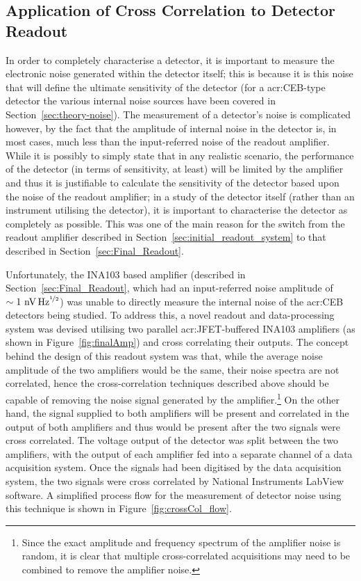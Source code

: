 \subsection{Application of Cross Correlation to Detector Readout}
\label{ssec:appCrossCol}
In order to completely characterise a detector, it is important to measure the electronic noise generated within the detector itself; this is because it is this noise that will define the ultimate sensitivity of the detector (for a \gls{acr:CEB}-type detector the various internal noise sources have been covered in Section~\ref{sec:theory-noise}). The measurement of a detector's noise is complicated however, by the fact that the amplitude of internal noise in the detector is, in most cases, much less than the input-referred noise of the readout amplifier. While it is possibly to simply state that in any realistic scenario, the performance of the detector (in terms of sensitivity, at least) will be limited by the amplifier and thus it is justifiable to calculate the sensitivity of the detector based upon the noise of the readout amplifier; in a study of the detector itself (rather than an instrument utilising the detector), it is important to characterise the detector as completely as possible. This was one of the main reason for the switch from the readout amplifier described in Section~\ref{sec:initial_readout_system} to that described in Section~\ref{sec:Final_Readout}.
\par
Unfortunately, the INA103 based amplifier (described in Section~\ref{sec:Final_Readout}, which had an input-referred noise amplitude of $\sim 1~\mathrm{nV\,Hz}^{\nicefrac{1}{2}}$) was unable to directly measure the internal noise of the \gls{acr:CEB} detectors being studied. To address this, a novel readout and data-processing system was devised utilising two parallel \gls{acr:JFET}-buffered INA103 amplifiers (as shown in Figure~\ref{fig:finalAmp}) and cross correlating their outputs. The concept behind the design of this readout system was that, while the average noise amplitude of the two amplifiers would be the same, their noise spectra are not correlated, hence the cross-correlation techniques described above should be capable of removing the noise signal generated by the amplifier.\footnote{Since the exact amplitude and frequency spectrum of the amplifier noise is random, it is clear that multiple cross-correlated acquisitions may need to be combined to remove the amplifier noise.} On the other hand, the signal supplied to both amplifiers will be present and correlated in the output of both amplifiers and thus would be present after the two signals were cross correlated. The voltage output of the detector was split between the two amplifiers, with the output of each amplifier fed into a separate channel of a data acquisition system. Once the signals had been digitised by the data acquisition system, the two signals were cross correlated by National Instruments LabView software. A simplified process flow for the measurement of detector noise using this technique is shown in Figure~\ref{fig:crossCol_flow}.
